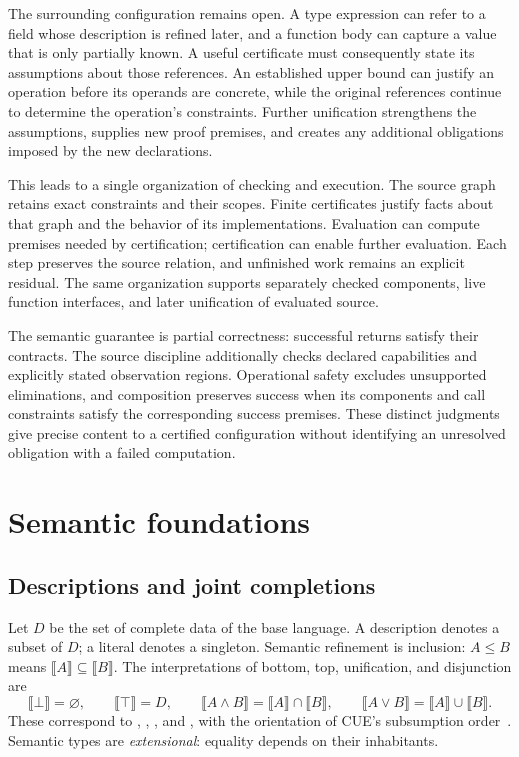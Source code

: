 \documentclass[10pt,a4paper]{article}
\newcommand{\code}[1]{\texttt{\detokenize{#1}}}
\newcommand{\sem}[1]{\llbracket #1\rrbracket}
\theoremstyle{remark}
\begin{document}
The surrounding configuration remains open. A type expression can refer to a
field whose description is refined later, and a function body can capture a
value that is only partially known. A useful certificate must consequently
state its assumptions about those references. An established upper bound can
justify an operation before its operands are concrete, while the original
references continue to determine the operation's constraints. Further
unification strengthens the assumptions, supplies new proof premises, and
creates any additional obligations imposed by the new declarations.

This leads to a single organization of checking and execution. The source graph
retains exact constraints and their scopes. Finite certificates justify facts
about that graph and the behavior of its implementations. Evaluation can compute
premises needed by certification; certification can enable further evaluation.
Each step preserves the source relation, and unfinished work remains an explicit
residual. The same organization supports separately checked components, live
function interfaces, and later unification of evaluated source.

The semantic guarantee is partial correctness: successful returns satisfy their
contracts. The source discipline additionally checks declared capabilities and
explicitly stated observation regions. Operational safety excludes unsupported
eliminations, and composition preserves success when its components and call
constraints satisfy the corresponding success premises. These distinct
judgments give precise content to a certified configuration without identifying
an unresolved obligation with a failed computation.

\section{Semantic foundations}
\label{sec:semantics}

\subsection{Descriptions and joint completions}
Let $D$ be the set of complete data of the base language. A description denotes
a subset of $D$; a literal denotes a singleton. Semantic refinement is inclusion:
$A\le B$ means $\sem A\subseteq\sem B$. The interpretations of bottom, top,
unification, and disjunction are
\[
 \sem\bot=\varnothing,\qquad \sem\top=D,\qquad
 \sem{A\land B}=\sem A\cap\sem B,\qquad
 \sem{A\lor B}=\sem A\cup\sem B.
\]
These correspond to \code{_|_}, \code{_}, \code{&}, and \code{|}, with the
orientation of CUE's subsumption order~\cite{cuespec}. Semantic types are
\emph{extensional}: equality depends on their inhabitants.
\end{document}

